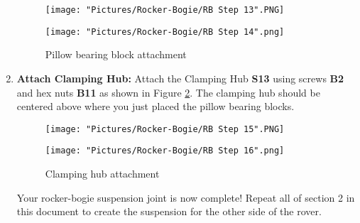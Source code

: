 \documentclass[12pt]{article}
\begin{document}
\begin{enumerate}
\begin{figure}[H]
  \centering
  \begin{minipage}[b]{0.45\textwidth}
    \texttt{[image: "Pictures/Rocker-Bogie/RB Step 13".PNG]}
  \end{minipage}
  \hfill
  \begin{minipage}[b]{0.45\textwidth}
    \texttt{[image: "Pictures/Rocker-Bogie/RB Step 14".png]}
  \end{minipage}
  \caption{Pillow bearing block attachment}
  \label{pillow bearing block}
\end{figure}

\item \textbf{Attach Clamping Hub:} Attach the Clamping Hub \textbf{S13} using screws \textbf{B2} and hex nuts \textbf{B11} as shown in Figure \ref{clamping hub}. The clamping hub should be centered above where you just placed the pillow bearing blocks. 

\begin{figure}[H]
  \centering
  \begin{minipage}[b]{0.45\textwidth}
    \texttt{[image: "Pictures/Rocker-Bogie/RB Step 15".PNG]}
  \end{minipage}
  \hfill
  \begin{minipage}[b]{0.45\textwidth}
    \texttt{[image: "Pictures/Rocker-Bogie/RB Step 16".png]}
  \end{minipage}
  \caption{Clamping hub attachment}
  \label{clamping hub}
\end{figure}

Your rocker-bogie suspension joint is now complete!  Repeat all of section 2 in this document to create the suspension for the other side of the rover.


\end{enumerate}
\end{document}
